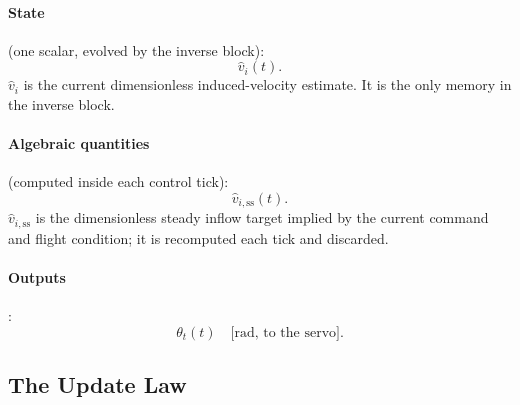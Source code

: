 \documentclass[11pt,a4paper]{article}
\newcommand{\thetat}{\theta_t}
\begin{document}
\paragraph{State} (one scalar, evolved by the inverse block):
\begin{equation}
\hat v_i(t).
\end{equation}
\(\hat v_i\) is the current dimensionless induced-velocity estimate. It is
the only memory in the inverse block.

\paragraph{Algebraic quantities} (computed inside each control tick):
\begin{equation}
\hat v_{i,\text{ss}}(t).
\end{equation}
\(\hat v_{i,\text{ss}}\) is the dimensionless steady inflow target implied
by the current command and flight condition; it is recomputed each tick
and discarded.

\paragraph{Outputs}:
\begin{equation}
\thetat(t)\quad\text{[rad, to the servo]}.
\end{equation}

\subsection{The Update Law}\label{ssec:impl_update}
\end{document}

